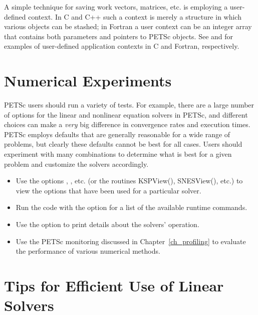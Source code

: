 {{A simple technique for saving work vectors, matrices, etc. is employing
a user-defined context.  In C and C++ such a context is merely a
structure in which various objects can be stashed; in Fortran a user
context can be an integer array that contains both parameters and pointers
to PETSc objects. See  and 
 for examples of user-defined application
contexts in C and Fortran, respectively.

\section{Numerical Experiments}

PETSc users should run a variety of tests.  For example, there are a large number of options 
for the linear and nonlinear equation solvers in PETSc, and different 
choices can make a {\em very} big difference in convergence rates and execution 
times.  PETSc employs defaults that are generally reasonable for a wide
range of problems, but clearly these defaults cannot be best for all
cases.  Users should experiment with many combinations to determine 
what is best for a given problem and customize the solvers accordingly.
\begin{itemize}
\item Use the options , , etc. (or the routines 
     KSPView(), SNESView(), etc.) to view the options that have been
     used for a particular solver.
\item Run the code with the option  for a list of the available 
     runtime commands.
\item Use the option  to print details about the solvers' operation.
\item Use the PETSc monitoring discussed in Chapter~\ref{ch_profiling}
     to evaluate the performance of various numerical methods.
\end{itemize}

\section{Tips for Efficient Use of Linear Solvers}
\label{sec_slestips}

}}
